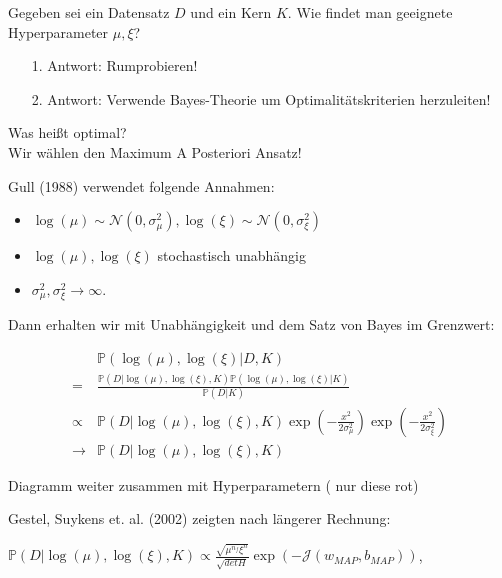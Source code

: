 \documentclass{beamer}
\begin{document}
{\begin{frame}
	Gegeben sei ein Datensatz $D$ und ein Kern $K$. Wie findet man geeignete Hyperparameter $\mu, \xi$?
	\begin{itemize}
		\item[1.]Antwort: Rumprobieren!
		\item[2.]Antwort: Verwende Bayes-Theorie um Optimalitätskriterien herzuleiten!
	\end{itemize}
	Was heißt optimal?\\
	Wir wählen den Maximum A Posteriori Ansatz!
\end{frame}


\begin{frame}

Gull (1988) verwendet folgende Annahmen:

\begin{itemize}
	\item $\log(\mu) \sim \mathcal{N}(0, \sigma_\mu^2), \log(\xi) \sim \mathcal{N}(0, 				  \sigma_\xi^2)$ 
	\item $\log(\mu), \log(\xi)$ stochastisch unabhängig
	\item $\sigma_\mu^2, \sigma_\xi^2 \rightarrow \infty$.
\end{itemize}

Dann erhalten wir mit Unabhängigkeit und dem Satz von Bayes im Grenzwert:

\begin{align}
&\mathbb{P}(\log(\mu), \log(\xi)\vert D, K)\\
 =& \frac{\mathbb{P}(D\vert \log(\mu),\log(\xi),K)\mathbb{P}(\log(\mu), \log(\xi) \vert K)}{\mathbb{P}(D\vert K)}  \\
 \propto & \mathbb{P}(D\vert \log(\mu),\log(\xi),K)\exp(-\frac{x^2}{2\sigma_\mu^2})\exp(-\frac{x^2}{2\sigma_\xi^2})\\
\rightarrow & \mathbb{P}(D\vert \log(\mu),\log(\xi),K)
\end{align}

\end{frame}


\begin{frame}

Diagramm weiter zusammen mit Hyperparametern ( nur diese rot)

\end{frame}


\begin{frame}
Gestel, Suykens et. al. (2002) zeigten nach längerer Rechnung:

\begin{center}
$\mathbb{P}(D\vert \log(\mu),\log(\xi),K) \propto \frac{\sqrt{\mu^{n_f} \xi^n}}{\sqrt{det H}} \exp(- \mathcal{J}(w_{MAP},b_{MAP}))$,
\end{center}


\end{frame}}
\end{document}
